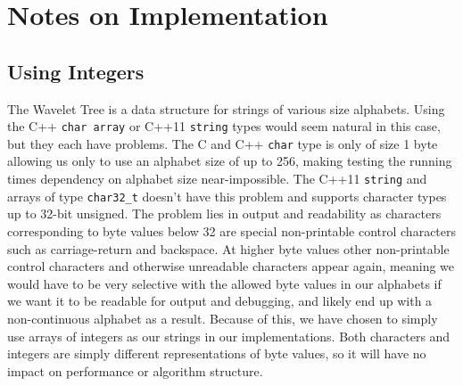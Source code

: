 \section{Notes on Implementation}

\subsection{Using Integers}
The Wavelet Tree is a data structure for strings of various size alphabets. Using the C++ \texttt{char array} or C++11 \texttt{string} types would seem natural in this case, but they each have problems.
The C and C++ \texttt{char} type is only of size 1 byte allowing us only to use an alphabet size of up to 256, making testing the running times dependency on alphabet size near-impossible.
The C++11 \texttt{string} and arrays of type \texttt{char32\_t} doesn't have this problem and supports character types up to 32-bit unsigned. The problem lies in output and readability as characters corresponding to byte values below 32 are special non-printable control characters such as carriage-return and backspace. At higher byte values other non-printable control characters and otherwise unreadable characters appear again, meaning we would have to be very selective with the allowed byte values in our alphabets if we want it to be readable for output and debugging, and likely end up with a non-continuous alphabet as a result.
Because of this, we have chosen to simply use arrays of integers as our strings in our implementations. Both characters and integers are simply different representations of byte values, so it will have no impact on performance or algorithm structure.